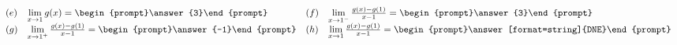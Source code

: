 \documentclass{ximera}
\begin{document}
\begin{exercise}
\[\begin{array}{l l l l}
(e) & \lim\limits_{x\to 1} g(x)=\begin{prompt}\answer{3}\end{prompt} &
(f) & \lim\limits_{x\to 1^-} \frac{g(x)-g(1)}{x-1}=\begin{prompt}\answer{3}\end{prompt}\\

(g) & \lim\limits_{x\to 1^+} \frac{g(x)-g(1)}{x-1}=\begin{prompt}\answer{-1}\end{prompt} &
(h) & \lim\limits_{x\to 1} \frac{g(x)-g(1)}{x-1}=\begin{prompt}\answer[format=string]{DNE}\end{prompt}
\end{array}
\]
\end{exercise}
\end{document}
